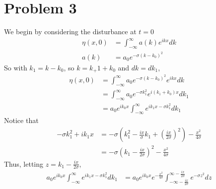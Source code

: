 \documentclass[12pt]{article}
\newcommand{\eq}[1]{\begin{align*}#1\end{align*}}
\begin{document}
\section*{Problem 3}
We begin by considering the disturbance at $t = 0$
\eq{
	\eta(x,0) &= \int_{-\infty}^\infty a(k)e^{ikx}dk\\
	a(k) &= a_0 e^{-\sigma(k - k_0)^2}
}
So with $k_1 = k - k_0$, so $k = k_+1 + k_0$ and $dk = dk_1$,
\eq{
	\eta(x, 0) &= \int_{-\infty}^\infty a_0 e^{-\sigma(k - k_0)^2}e^{ikx}dk\\
	&= \int_{-\infty}^\infty a_0 e^{-\sigma k_1^2}e^{i(k_1 + k_0)x}dk_1\\
	&= a_0 e^{ik_0x}\int_{-\infty}^\infty e^{ik_1 x - \sigma k_1^2} dk_1
}
Notice that
\eq{
	-\sigma k_1^2 + ik_1x &= -\sigma(k_1^2 - \frac{ix}{\sigma}k_1 + \left(\frac{ix}{2\sigma}\right)^2) - \frac{x^2}{4\sigma}\\
	&= -\sigma(k_1 - \frac{ix}{2\sigma})^2 - \frac{x^2}{4\sigma}
}
Thus, letting $z = k_1 - \frac{ix}{2\sigma}$,
\eq{
	a_0 e^{ik_0x}\int_{-\infty}^\infty e^{ik_1 x - \sigma k_1^2} dk_1 &= a_0e^{ik_0 x}e^{-\frac{x^2}{4\sigma}}\int_{-\infty - \frac{ix}{2\sigma}}^{\infty - \frac{ix}{2\sigma}} e^{-\sigma z^2}dz
}
\end{document}
